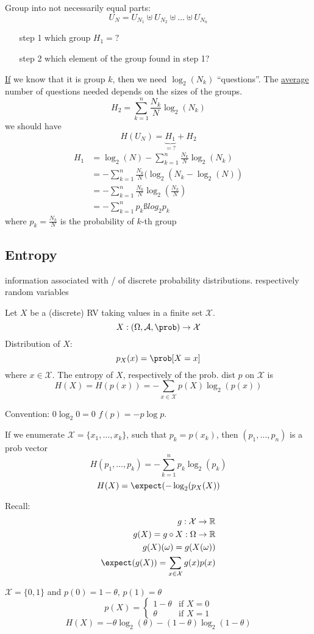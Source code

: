 \documentclass[mfit.tex]{subfiles}
\begin{document}
Group into not necessarily equal parts:
\[ U_N = U_{N_1} \uplus U_{N_2} \uplus \dots \uplus U_{N_n} \]
\begin{enumerate}
  \item[step 1] which group $H_1 = ?$
  \item[step 2] which element of the group found in step 1?
\end{enumerate}
\underline{If} we know that it is group $k$, then we need $\log_2(N_k)$ \enquote{questions}.
The \underline{average} number of questions needed depends on the sizes of the groups.
\[ H_2 = \sum_{k=1}^n \frac{N_k}{N} \log_2 (N_k) \]
we should have
\[ H(U_N) = \underbrace{H_1}_{=?} + H_2 \]
\begin{align*}
  H_1 &= \log_2(N) - \sum_{k=1}^n \frac{N_k}{N} \log_2(N_k) \\
  &= - \sum_{k=1}^n \frac{N_k}{N} ( \log_2(N_k - \log_2(N)) \\
  &= - \sum_{k=1}^n \frac{N_k}{N} \log_2(\frac{N_k}{N}) \\
  &= - \sum_{k=1}^n p_k ßlog_2 p_k
\end{align*}
where $p_k = \frac{N_k}{N}$ is the probability of $k$-th group

\subsection{Entropy}

information associated with / of discrete probability distributions.
respectively random variables

\begin{defi}
  Let $X$ be a (discrete) RV taking values in a finite set $\mathcal{X}$.
  \[ X: (\Omega,\mathcal{A},\prob) \to \mathcal{X} \]
  Distribution of $X$:
  \[ p_X(x) = \prob[X = x] \]
  where $x \in \mathcal{X}$.
  The entropy of $X$, respectively of the prob. dist $p$ on $\mathcal{X}$ is
  \[ H(X) = H(p(x)) = - \sum_{x \in \mathcal{X}} p(X) \log_2(p(x)) \]
\end{defi}

Convention: $0 \log_2 0 = 0$ $f(p) = - p \log p$.


If we enumerate $\mathcal{X} = \{x_1,\dots,x_k\}$, such that $p_k = p(x_k)$,
 then $(p_1,\dots,p_n)$ is a prob vector
 \[ H(p_1,\dots,p_k) = - \sum_{k=1}^n p_k \log_2(p_k) \]
 \[ H(X) = \expect(- \log_2(p_X(X)) \]
 
Recall:
\begin{align*}
  g: \mathcal{X} \to \R \\
  g(X) = g \circ X: \Omega \to \R \\
  g(X)(\omega) = g(X(\omega)) \\
  \expect(g(X)) = \sum_{x \in \mathcal{X}} g(x) p(x)
\end{align*}

\begin{ex}
  $\mathcal{X} = \{0,1\}$ and $p(0) = 1 - \theta$, $p(1) = \theta$
  \[ p(X) = \begin{cases} 1- \theta & \text{if } X=0\\ \theta & \text{if } X=1 \end{cases} \]
  \[ H(X) = - \theta \log_2(\theta) - (1-\theta) \log_2(1-\theta) \]
\end{ex}
\end{document}
